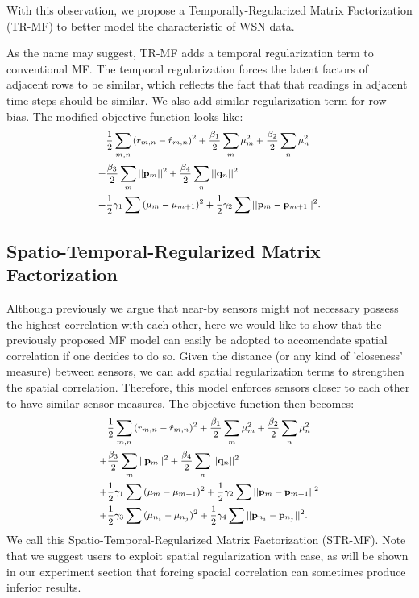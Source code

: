 With this observation, we propose a Temporally-Regularized Matrix Factorization (TR-MF) to better model the characteristic of WSN data. 

As the name may suggest, TR-MF adds a temporal regularization term to conventional MF.
The temporal regularization forces the latent factors of adjacent rows to be similar, which reflects the fact that that readings in adjacent time steps should be similar. We also add similar regularization term for row bias.
The modified objective function looks like: 
\begin{equation*}\small \begin{aligned}
&\frac{1}{2}\sum_{m,n}{(r_{m,n} - \hat{r}_{m,n})}^2 + \frac{\beta_1}{2}\sum_m{\mu_m^2} + \frac{\beta_2}{2}\sum_n{\mu_n^2}\\
+& \frac{\beta_3}{2}\sum_m{||\mathbf{p}_m||^2} + \frac{\beta_4}{2}\sum_n{||\mathbf{q}_n||^2}\\
+& \frac{1}{2}\gamma_1\sum{(\mu_m-\mu_{m+1})^2} 
+ \frac{1}{2}\gamma_2\sum{||\mathbf{p}_m-\mathbf{p}_{m+1}||^2}.
\end{aligned}\end{equation*}

\subsection{Spatio-Temporal-Regularized Matrix Factorization}
Although previously we argue that near-by sensors might not necessary possess the highest correlation with each other, here we would like to show that the previously proposed MF model can easily be adopted to accomendate spatial correlation if one decides to do so. Given the distance (or any kind of 'closeness' measure) between sensors, we can add spatial regularization terms to strengthen the spatial correlation. Therefore, this model enforces sensors closer to each other to have similar sensor measures. 
The objective function then becomes: 
\begin{equation*}\small \begin{aligned}
&\frac{1}{2}\sum_{m,n}{(r_{m,n} - \hat{r}_{m,n})}^2 + \frac{\beta_1}{2}\sum_m{\mu_m^2} + \frac{\beta_2}{2}\sum_n{\mu_n^2}\\
+&\frac{\beta_3}{2}\sum_m{||\mathbf{p}_m||^2} + \frac{\beta_4}{2}\sum_n{||\mathbf{q}_n||^2}\\ 
+&\frac{1}{2}\gamma_1\sum{(\mu_m-\mu_{m+1})^2}
+ \frac{1}{2}\gamma_2\sum{||\mathbf{p}_m-\mathbf{p}_{m+1}||^2}\\
+&\frac{1}{2}\gamma_3\sum{(\mu_{n_i}-\mu_{n_j})^2} 
+ \frac{1}{2}\gamma_4\sum{||\mathbf{p}_{n_i}-\mathbf{p}_{n_j}||^2}.
\end{aligned}\end{equation*}
We call this Spatio-Temporal-Regularized Matrix Factorization (STR-MF). Note that we suggest users to exploit spatial regularization with case, as will be shown in our experiment section that forcing spacial correlation can sometimes produce inferior results. 

